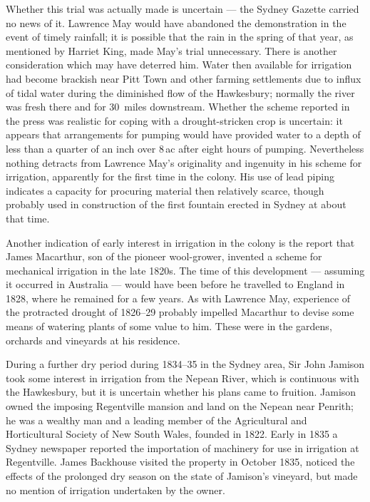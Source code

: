 Whether this trial was actually made is uncertain --- the Sydney
Gazette carried no news of it.  Lawrence May would have abandoned the
demonstration in the event of timely rainfall; it is possible that the
rain in the spring of that year, as mentioned by Harriet King, made
May's trial unnecessary.  There is another consideration which may
have deterred him.  Water then available for irrigation had become
brackish near Pitt Town and other farming settlements due to influx of
tidal water during the diminished flow of the Hawkesbury; normally the
river was fresh there and for 30~miles downstream.  Whether the scheme reported in the press was
realistic for coping with a drought-stricken crop is uncertain: it
appears that arrangements for pumping would have provided water to a
depth of less than a quarter of an inch over 8\,ac after eight hours
of pumping.  Nevertheless nothing detracts from Lawrence May's
originality and ingenuity in his scheme for irrigation, apparently for
the first time in the colony.  His use of lead piping indicates a
capacity for procuring material then relatively scarce, though
probably used in construction of the first fountain erected in Sydney
at about that time.

Another indication of early interest in irrigation in the colony is
the report that James Macarthur, son of the pioneer wool-grower,
invented a scheme for mechanical irrigation in the late 1820s.  The
time of this development --- assuming it occurred in Australia ---
would have been before he travelled to England in 1828, where he
remained for a few years.  As with Lawrence May, experience of the
protracted drought of 1826--29 probably impelled Macarthur to devise
some means of watering plants of some value to him.  These were in the
gardens, orchards and vineyards at his
residence.

During a further dry period during 1834--35 in the Sydney area, Sir
John Jamison took some interest in irrigation from the Nepean River,
which is continuous with the Hawkesbury, but it is uncertain whether
his plans came to fruition.  Jamison owned the imposing Regentville
mansion and land on the Nepean near Penrith; he was a wealthy man and
a leading member of the Agricultural and Horticultural Society of New
South Wales, founded in 1822.  Early in 1835 a Sydney newspaper
reported the importation of machinery for use in irrigation at
Regentville.  James Backhouse visited the property in October 1835,
noticed the effects of the prolonged dry season on the state of
Jamison's vineyard, but made no mention of irrigation undertaken by
the owner.

